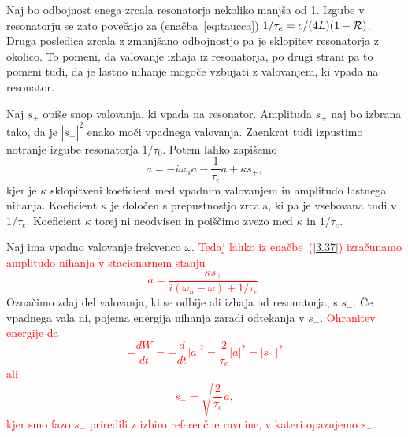 Naj bo odbojnost enega zrcala resonatorja nekoliko manjša od 1. Izgube v resonatorju 
se zato povečajo za (enačba~\ref{eq:taucca}) $1/\tau_{e}=c/(4L)(1-{\cal R})$. Druga posledica
zrcala z zmanjšano odbojnostjo pa je sklopitev resonatorja z okolico. To pomeni, 
da valovanje izhaja iz resonatorja, po drugi strani pa to pomeni tudi, da je 
lastno nihanje mogoče vzbujati z valovanjem, ki vpada na resonator.

Naj $s_{+}$ opiše snop valovanja, ki vpada na resonator. Amplituda $s_{+}$
naj bo izbrana tako, da je $|s_{+}|^{2}$ enako moči vpadnega valovanja. Zaenkrat
tudi izpustimo notranje izgube resonatorja $1/\tau_{0}$. Potem lahko
zapišemo 
\begin{equation}
\dot{a}=-i\omega_{n}a-\frac{1}{\tau_{e}}a+\kappa s_{+},
\label{3.37}
\end{equation}
kjer je $\kappa$ sklopitveni koeficient med vpadnim valovanjem in
amplitudo lastnega nihanja. Koeficient $\kappa$ je določen
s prepustnostjo zrcala, ki pa je vsebovana tudi v $1/\tau_{e}$. Koeficient
$\kappa$ torej ni neodvisen in poiščimo zvezo med $\kappa$ in $1/\tau_{e}$.

Naj ima vpadno valovanje frekvenco $\omega$. \textcolor{red}{Tedaj lahko iz enačbe~(\ref{3.37}) 
izračunamo amplitudo nihanja v stacionarnem stanju
\begin{equation}
a=\frac{\kappa s_{+}}{i(\omega_{n}-\omega)+1/\tau_{e}}.
\label{3.38}
\end{equation}
 }
Označimo zdaj del valovanja, ki se odbije ali izhaja od resonatorja, s $s_{-}$.
Če vpadnega vala ni, pojema energija nihanja zaradi odtekanja v $s_{-}$.
\textcolor{red}{Ohranitev energije da 
\begin{equation}
-\frac{dW}{dt}=-\frac{d}{dt}|a|^{2}=\frac{2}{\tau_{e}}|a|^{2}=|s_{-}|^{2}
\label{3.39}
\end{equation}
ali 
\begin{equation}
s_{-}=\sqrt{\frac{2}{\tau_{e}}}a,
\label{3.40}
\end{equation}
kjer smo fazo $s_{-}$ priredili z izbiro referenčne ravnine, v kateri
opazujemo $s_{-}$.}

